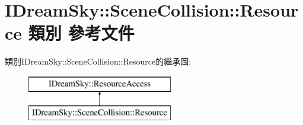 \hypertarget{class_i_dream_sky_1_1_scene_collision_1_1_resource}{}\section{I\+Dream\+Sky\+:\+:Scene\+Collision\+:\+:Resource 類別 參考文件}
\label{class_i_dream_sky_1_1_scene_collision_1_1_resource}
類別\+I\+Dream\+Sky\+:\+:Scene\+Collision\+:\+:Resource的繼承圖\+:\begin{figure}[H]
\begin{center}
\leavevmode
\includegraphics[height=2.000000cm]{class_i_dream_sky_1_1_scene_collision_1_1_resource}
\end{center}
\end{figure}
